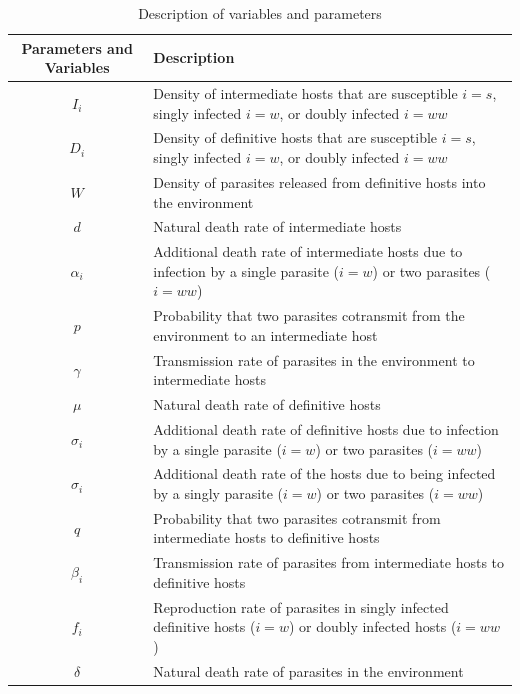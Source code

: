 \documentclass[11pt]{article}
\begin{document}
\begin{table}[h]
\caption{Description of variables and parameters}
\label{table:varpardescription}
\centering
\begin{tabular}{c|p{10cm}}%
\hline
Parameters and Variables    &  Description  \\
\hline
$I_i$  & Density of intermediate hosts that are susceptible $i=s$, singly infected $i=w$, or doubly infected $i=ww$ \\
\hline
$D_i$ & Density of definitive hosts that are susceptible $i=s$, singly infected $i=w$, or doubly infected $i=ww$ \\
\hline
$W$ & Density of parasites released from definitive hosts into the environment \\
\hline
$d$ & Natural death rate of intermediate hosts \\
\hline
$\alpha_i$ & Additional death rate of intermediate hosts due to infection by a single parasite ($i = w$) or two parasites ($i = ww$) \\
\hline
$p$ & Probability that two parasites cotransmit from the environment to an intermediate host \\
\hline
$\gamma$ & Transmission rate of parasites in the environment to intermediate hosts \\
\hline
$\mu$ & Natural death rate of definitive hosts \\
\hline
$\sigma_i$ & Additional death rate of definitive hosts due to infection by a single parasite ($i = w$) or two parasites ($i = ww$) \\
\hline
$\sigma_i$ & Additional death rate of the hosts due to being infected by a singly parasite ($i = w$) or two parasites ($i = ww$) \\
\hline
$q$ & Probability that two parasites cotransmit from intermediate hosts to definitive hosts \\
\hline
$\beta_i$ & Transmission rate of parasites from intermediate hosts to definitive hosts \\
\hline
$f_i$ & Reproduction rate of parasites in singly infected definitive hosts ($i = w$) or doubly infected hosts ($i = ww$)\\
\hline
$\delta$ & Natural death rate of parasites in the environment \\
\hline
\end{tabular}
\bigskip{}\\
\end{table}

\newpage{}
\end{document}
